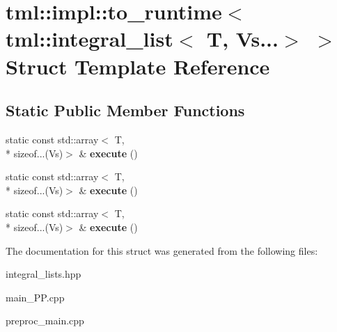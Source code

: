 \hypertarget{structtml_1_1impl_1_1to__runtime_3_01tml_1_1integral__list_3_01T_00_01Vs_8_8_8_4_01_4}{\section{tml\+:\+:impl\+:\+:to\+\_\+runtime$<$ tml\+:\+:integral\+\_\+list$<$ T, Vs...$>$ $>$ Struct Template Reference}
\label{structtml_1_1impl_1_1to__runtime_3_01tml_1_1integral__list_3_01T_00_01Vs_8_8_8_4_01_4}
}
\subsection*{Static Public Member Functions}
\begin{DoxyCompactItemize}
\item 
\hypertarget{structtml_1_1impl_1_1to__runtime_3_01tml_1_1integral__list_3_01T_00_01Vs_8_8_8_4_01_4_a87958fbad726e29183a4953283a5ddc7}{static const std\+::array$<$ T, \\*
sizeof...(Vs)$>$ \& {\bfseries execute} ()}\label{structtml_1_1impl_1_1to__runtime_3_01tml_1_1integral__list_3_01T_00_01Vs_8_8_8_4_01_4_a87958fbad726e29183a4953283a5ddc7}

\item 
\hypertarget{structtml_1_1impl_1_1to__runtime_3_01tml_1_1integral__list_3_01T_00_01Vs_8_8_8_4_01_4_a87958fbad726e29183a4953283a5ddc7}{static const std\+::array$<$ T, \\*
sizeof...(Vs)$>$ \& {\bfseries execute} ()}\label{structtml_1_1impl_1_1to__runtime_3_01tml_1_1integral__list_3_01T_00_01Vs_8_8_8_4_01_4_a87958fbad726e29183a4953283a5ddc7}

\item 
\hypertarget{structtml_1_1impl_1_1to__runtime_3_01tml_1_1integral__list_3_01T_00_01Vs_8_8_8_4_01_4_a87958fbad726e29183a4953283a5ddc7}{static const std\+::array$<$ T, \\*
sizeof...(Vs)$>$ \& {\bfseries execute} ()}\label{structtml_1_1impl_1_1to__runtime_3_01tml_1_1integral__list_3_01T_00_01Vs_8_8_8_4_01_4_a87958fbad726e29183a4953283a5ddc7}

\end{DoxyCompactItemize}


The documentation for this struct was generated from the following files\+:\begin{DoxyCompactItemize}
\item 
integral\+\_\+lists.\+hpp\item 
main\+\_\+\+P\+P.\+cpp\item 
preproc\+\_\+main.\+cpp\end{DoxyCompactItemize}
